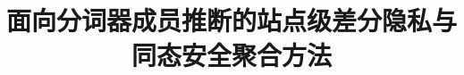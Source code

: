 \documentclass[final]{jcr}
\begin{document}
\setcounter{page}{1}

\begin{frontmatter}
  \title[面向分词器成员推断的安全聚合方法]{面向分词器成员推断的站点级差分隐私与同态安全聚合方法}

  \author[1]{\AuthorNameCN}
  \eauthor[1]{\AuthorNameEN}
  \address[1]{\AuthorAffiliationCN\\E-mail: \AuthorEmail\\代码仓库：\url{https://github.com/t12138ang/TokenizerPrivacyReport}}

  
\end{frontmatter}












\begingroup
{}

\endgroup
\end{document}
